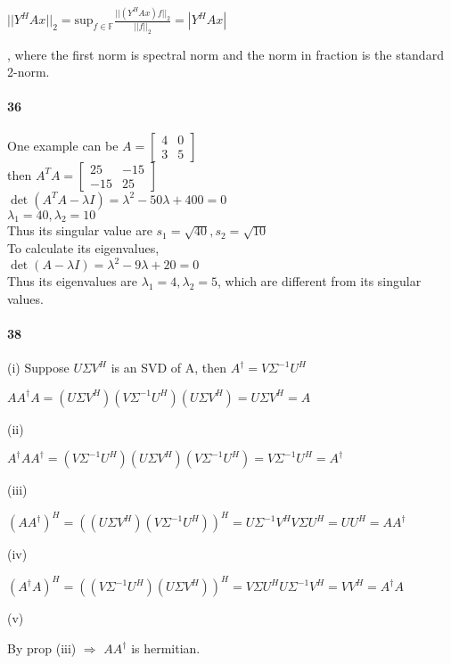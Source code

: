 \documentclass[10pt,letter]{article}
\begin{document}
$||Y^{H}Ax ||_{2} = \text{sup}_{f \in \mathbb{F}}\frac{||(Y^{H}Ax)f||_{2}}{||f||_{2}} = |Y^{H}Ax|$

, where the first norm is spectral norm and the norm in fraction is the standard 2-norm.

\paragraph{36}
One example can be  $A=\begin{bmatrix}
4&0\\3&5
\end{bmatrix}$\\
then $A^TA=\begin{bmatrix}
25&-15\\-15&25
\end{bmatrix}$\\
$\det(A^TA-\lambda I)=\lambda^2-50\lambda+400=0$\\
$\lambda_1=40, \lambda_2=10$\\
Thus its singular value are $s_1=\sqrt{40}, s_2=\sqrt{10}$\\
To calculate its eigenvalues, \\
$\det(A-\lambda I)=\lambda^2-9\lambda+20=0$\\
Thus its eigenvalues are $\lambda_1=4,\lambda_2=5$, which are different from its singular values.
\paragraph{38}

(i) Suppose $U \Sigma V^{H}$ is an SVD of A, then $A^\dagger = V \Sigma^{-1} U^H$

$
AA^\dagger A = (U \Sigma V^H) (V \Sigma^{-1} U^H) (U \Sigma V^H) = U \Sigma V^H = A
$

\noindent (ii)

$A^\dagger A A^\dagger = (V \Sigma^{-1} U^H) (U \Sigma V^H) (V \Sigma^{-1} U^H) = V \Sigma^{-1} U^H = A^\dagger $

\noindent (iii)

$
(AA^\dagger)^H = ((U \Sigma V^H) (V \Sigma^{-1} U^H))^H = U \Sigma^{-1}V^H V \Sigma U^H = UU^H = AA^\dagger
$

\noindent (iv)

$
(A^\dagger A)^H = ((V \Sigma^{-1} U^H) (U \Sigma V^H))^H = V \Sigma U^H U \Sigma^{-1} V^H = VV^H = A^\dagger A
$

\noindent (v)

By prop (iii) $\Rightarrow$ $A A^\dagger$ is hermitian.
\end{document}
